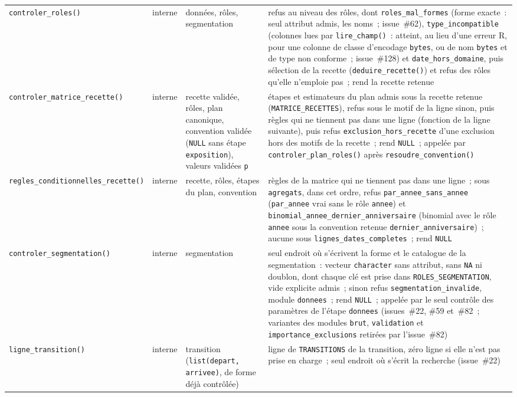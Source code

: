 \documentclass[a4paper,11pt]{article}
\newcommand{\code}[1]{\texttt{\small #1}}
\newcommand{\catalogue}[2]{\code{#2}}
\begin{document}
{\begin{longtable}{@{}p{6.2cm}p{1.4cm}p{2.6cm}p{4.4cm}@{}}
\catalogue{fonctions-donnees}{controler\_roles()} & interne & données, rôles, segmentation & refus au niveau des rôles, dont \code{roles\_mal\_formes} (forme exacte~: seul attribut admis, les noms~; issue~\#62), \code{type\_incompatible} (colonnes lues par \code{lire\_champ()}~: atteint, au lieu d'une erreur R, pour une colonne de classe d'encodage \code{bytes}, ou de nom \code{bytes} et de type non conforme~; issue~\#128) et \code{date\_hors\_domaine}, puis sélection de la recette (\code{deduire\_recette()}) et refus des rôles qu'elle n'emploie pas~; rend la recette retenue \\
\catalogue{fonctions-donnees}{controler\_matrice\_recette()} & interne & recette validée, rôles, plan canonique, convention validée (\code{NULL} sans étape \code{exposition}), valeurs validées \code{p} & étapes et estimateurs du plan admis sous la recette retenue (\code{MATRICE\_RECETTES}), refus sous le motif de la ligne sinon, puis règles qui ne tiennent pas dans une ligne (fonction de la ligne suivante), puis refus \code{exclusion\_hors\_recette} d'une exclusion hors des motifs de la recette~; rend \code{NULL}~; appelée par \code{controler\_plan\_roles()} après \code{resoudre\_convention()} \\
\catalogue{fonctions-donnees}{regles\_conditionnelles\_recette()} & interne & recette, rôles, étapes du plan, convention & règles de la matrice qui ne tiennent pas dans une ligne~; sous \code{agregats}, dans cet ordre, refus \code{par\_annee\_sans\_annee} (\code{par\_annee} vrai sans le rôle \code{annee}) et \code{binomial\_annee\_}\allowbreak\code{dernier\_anniversaire} (binomial avec le rôle \code{annee} sous la convention retenue \code{dernier\_anniversaire})~; aucune sous \code{lignes\_dates\_completes}~; rend \code{NULL} \\
\catalogue{fonctions-donnees}{controler\_segmentation()} & interne & segmentation & seul endroit où s'écrivent la forme et le catalogue de la segmentation~: vecteur \code{character} sans attribut, sans \code{NA} ni doublon, dont chaque clé est prise dans \code{ROLES\_SEGMENTATION}, vide explicite admis~; sinon refus \code{segmentation\_invalide}, module \code{donnees}~; rend \code{NULL}~; appelée par le seul contrôle des paramètres de l'étape \code{donnees} (issues~\#22, \#59 et~\#82~; variantes des modules \code{brut}, \code{validation} et \code{importance\_exclusions} retirées par l'issue~\#82) \\
\catalogue{fonctions-donnees}{ligne\_transition()} & interne & transition (\code{list(depart, arrivee)}, de forme déjà contrôlée) & ligne de \code{TRANSITIONS} de la transition, zéro ligne si elle n'est pas prise en charge~; seul endroit où s'écrit la recherche (issue~\#22) \\

\end{longtable}}
\end{document}
